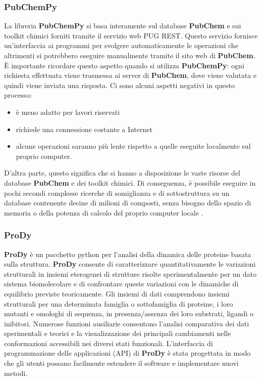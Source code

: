 \subsubsection{PubChemPy}
La libreria \textbf{PubChemPy} si basa interamente sul database \textbf{PubChem} e sui toolkit chimici forniti tramite il servizio web PUG REST. Questo servizio fornisce un'interfaccia ai programmi per svolgere automaticamente le operazioni che altrimenti si potrebbero eseguire manualmente tramite il sito web di \textbf{PubChem}. È importante ricordare questo aspetto quando si utilizza \textbf{PubChemPy}: ogni richiesta effettuata viene trasmessa ai server di \textbf{PubChem}, dove viene valutata e quindi viene inviata una risposta. Ci sono alcuni aspetti negativi in questo processo: 

\begin{itemize}
    \item è meno adatto per lavori riservati
    \item richiede una connessione costante a Internet
    \item alcune operazioni saranno più lente rispetto a quelle eseguite localmente sul proprio computer.
\end{itemize}

D'altra parte, questo significa che si hanno a disposizione le vaste risorse del database \textbf{PubChem} e dei toolkit chimici. Di conseguenza, è possibile eseguire in pochi secondi complesse ricerche di somiglianza e di sottostruttura su un database contenente decine di milioni di composti, senza bisogno dello spazio di memoria o della potenza di calcolo del proprio computer locale \cite{PubChempyDocumentation}.

\subsubsection{ProDy}
\textbf{ProDy} è un pacchetto python per l'analisi della dinamica delle proteine basata sulla struttura. \textbf{ProDy} consente di caratterizzare quantitativamente le variazioni strutturali in insiemi eterogenei di strutture risolte sperimentalmente per un dato sistema biomolecolare e di confrontare queste variazioni con le dinamiche di equilibrio previste teoricamente. Gli insiemi di dati comprendono insiemi strutturali per una determinata famiglia o sottofamiglia di proteine, i loro mutanti e omologhi di sequenza, in presenza/assenza dei loro substrati, ligandi o inibitori. Numerose funzioni ausiliarie consentono l'analisi comparativa dei dati sperimentali e teorici e la visualizzazione dei principali cambiamenti nelle conformazioni accessibili nei diversi stati funzionali. L'interfaccia di programmazione delle applicazioni (API) di \textbf{ProDy} è stata progettata in modo che gli utenti possano facilmente estendere il software e implementare nuovi metodi\cite{10.1093/bioinformatics/btr168}.

